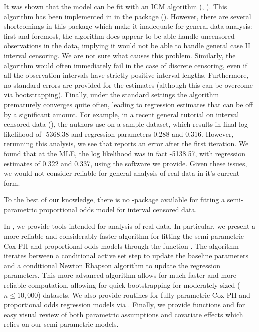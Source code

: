 \documentclass[article]{jss}
\begin{document}
	It was shown that the model can be fit with an ICM algorithm (\cite{basicICM}, \cite{coxphICM}). This algorithm has been implemented in  in the package  (\cite{intcox}). However, there are several shortcomings in this package which make it inadequate for general data analysis: first and foremost, the algorithm does appear to be able handle uncensored observations in the data, implying it would not be able to handle general case II interval censoring. We are not sure what causes this problem. Similarly, the algorithm would often immediately fail in the case of discrete censoring, even if all the observation intervals have strictly positive interval lengths. Furthermore, no standard errors are provided for the estimates (although this can be overcome via bootstrapping). Finally, under the standard settings the algorithm prematurely converges quite often, leading to regression estimates that can be off by a significant amount. For example, in a recent general tutorial on interval censored data (\cite{ic_tutorial}), the authors use  on a sample dataset, which results in final log likelihood of -5368.38 and regression parameters 0.288 and 0.316. However, rerunning this analysis, we see that  reports an error after the first iteration. We found that at the MLE, the log likelihood was in fact -5138.57, with regression estimates of 0.322 and 0.337, using the software we provide. Given these issues, we would not consider  reliable for general analysis of real data in it's current form. 
	
	To the best of our knowledge, there is no -package available for fitting a semi-parametric proportional odds model for interval censored data. 
	 
	 In , we provide tools intended for analysis of real data. In particular, we present a more reliable and considerably faster algorithm for fitting the semi-parametric Cox-PH and proportional odds models through the function . The algorithm iterates between a conditional active set step to update the baseline parameters and a conditional Newton Rhapson algorithm to update the regression parameters. This more advanced algorithm allows for much faster and more reliable computation, allowing for quick bootstrapping for moderately sized ($n \leq 10,000$) datasets. We also provide routines for fully parametric Cox-PH and proportional odds regression models via . Finally, we provide functions  and  for easy visual review of both parametric assumptions and covariate effects which relies on our semi-parametric models. 
	 
\end{document}
